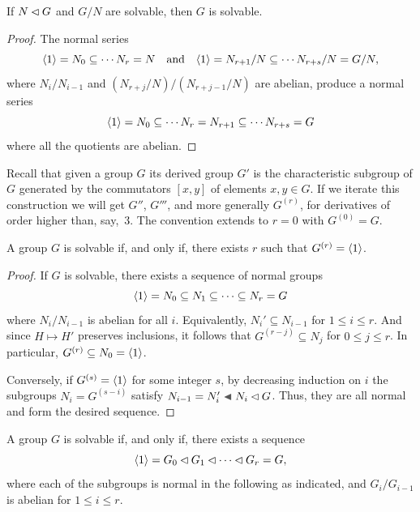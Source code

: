 \begin{prop}\label{solvable-ses}
    If\/ $N\lhd G$ and\/ $G/N$ are solvable, then\/ $G$ is solvable.
\end{prop}

\begin{proof} The normal series
$$
    \langle1\rangle = N_0\subseteq\cdots N_r=N\quad\text{and}\quad
    \langle1\rangle= N_{r+1}/N\subseteq\cdots N_{r+s}/N = G/N,
$$
where $N_i/N_{i-1}$ and $(N_{r+j}/N)/(N_{r+j-1}/N)$ are abelian, produce a normal series
$$
     \langle1\rangle = N_0\subseteq\cdots N_r= N_{r+1}\subseteq\cdots N_{r+s}=G
$$
where all the quotients are abelian.  \end{proof}

\begin{ntn}
    Recall that given a group\/ $G$ its derived group $G'$ is the characteristic subgroup of\/ $G$ generated by the commutators\/ $[x,y]$ of elements\/ $x,y\in G$. If we iterate this construction we will get\/ $G''$, $G'''$, and more generally\/ $G^{(r)}$, for derivatives of order higher than, say,~$3$. The convention extends to\/ $r=0$ with\/ $G^{(0)}=G$.
\end{ntn}

\begin{prop}\label{solvable-equals-finite-derivatives}
    A group\/ $G$ is solvable if, and only if, there exists\/ $r$ such that\/ $G^{(r)}=\langle1\rangle$.
\end{prop}

\begin{proof}
    If $G$ is solvable, there exists a sequence of normal groups
    $$
        \langle1\rangle=N_0\subseteq N_1\subseteq\cdots\subseteq N_r=G
    $$
    where $N_i/N_{i-1}$ is abelian for all $i$. Equivalently, $N_i'\subseteq N_{i-1}$ for $1\le i\le r$. And since $H\mapsto H'$ preserves inclusions, it follows that $G^{(r-j)}\subseteq N_j$ for $0\le j\le r$. In particular, $G^{(r)}\subseteq N_0=\langle1\rangle$.
    
    Conversely, if $G^{(s)}=\langle1\rangle$ for some integer $s$, by decreasing induction on $i$ the subgroups $N_i=G^{(s-i)}$ satisfy $N_{i-1}=N_i'\ch N_i\normal G$. Thus, they are all normal and form the desired sequence.
\end{proof}

\begin{cor}\label{solvable-equivalence}
    A group\/ $G$ is solvable if, and only if, there exists a sequence
    $$
        \langle1\rangle=G_0\lhd G_1\lhd\cdots\lhd G_r=G,
    $$
    where each of the subgroups is normal in the following as indicated, and\/ $G_i/G_{i-1}$ is abelian for\/ $1\le i\le r$.
\end{cor}

